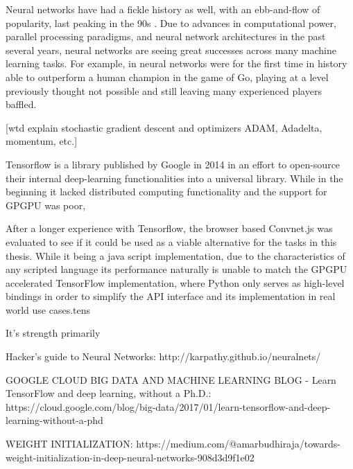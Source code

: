  Neural networks have had a fickle history as well, with an ebb-and-flow of popularity, last peaking in the 90s \cite{Bengio91z}.  Due to advances in computational power, parallel processing paradigms, and neural network architectures in the past several years, neural networks are seeing great successes across many machine learning tasks. For example, in \cite{Silver:2016aa} neural networks were for the first time in history able to outperform a human champion in the game of Go, playing at a level previously thought not possible and still leaving many experienced players baffled.  


 


 [wtd explain stochastic gradient descent and optimizers ADAM, Adadelta, momentum, etc.]



Tensorflow is a library published by Google in 2014 in an effort to open-source their internal deep-learning functionalities into a universal library. While in the beginning it lacked distributed computing functionality and the support for GPGPU was poor, 


After a longer experience with Tensorflow, the browser based Convnet.js was evaluated to see if it could be used as a viable alternative for the tasks in this thesis.
While it being a java script implementation, due to the characteristics of any scripted language its performance naturally is unable to match the GPGPU accelerated TensorFlow implementation, where Python only serves as high-level bindings in order to simplify the API interface and its implementation in real world use cases.tens

It's strength primarily 


Hacker's guide to Neural Networks: http://karpathy.github.io/neuralnets/

GOOGLE CLOUD BIG DATA AND MACHINE LEARNING BLOG - Learn TensorFlow and deep learning, without a Ph.D.: https://cloud.google.com/blog/big-data/2017/01/learn-tensorflow-and-deep-learning-without-a-phd


WEIGHT INITIALIZATION: https://medium.com/@amarbudhiraja/towards-weight-initialization-in-deep-neural-networks-908d3d9f1e02


